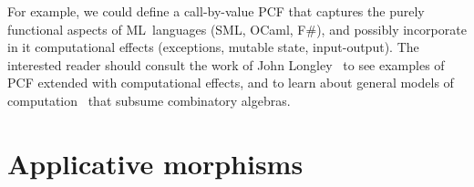 For example, we could define a call-by-value PCF that captures the purely functional aspects of ML~languages (SML, OCaml, F\#), and possibly incorporate in it    computational effects (exceptions, mutable state, input-output). 
The interested reader should consult the work of John Longley~ to see examples of PCF extended with computational effects, and to learn about general models of computation~ that subsume combinatory algebras.


\section{Applicative morphisms}
\label{sec:appl-morph}




